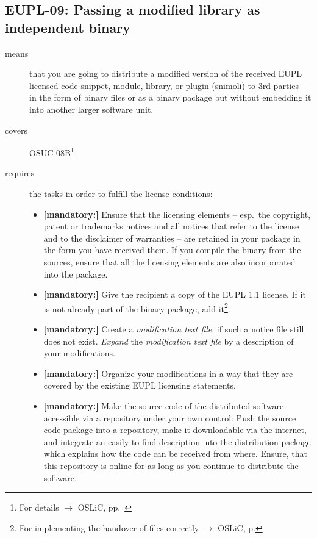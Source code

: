 \subsection{EUPL-09: Passing a modified library as independent binary}
\label{OSUC-08B-EUPL}

\begin{description}
\item[means] that you are going to distribute a modified version of the received
EUPL licensed code snippet, module, library, or plugin (snimoli) to 3rd parties
-- in the form of binary files or as a binary package but without embedding it
into another larger software unit.
\item[covers] OSUC-08B\footnote{For details $\rightarrow$ OSLiC, pp.\ \pageref{OSUC-08B-DEF}}
\item[requires] the tasks in order to fulfill the license conditions:
\begin{itemize}

  \item \textbf{[mandatory:]} Ensure that the licensing elements -- esp.\ the
  copyright, patent or trademarks notices and all notices that refer to the
  license and to the disclaimer of warranties -- are retained in your package in
  the form you have received them. If you compile the binary from the sources,
  ensure that all the licensing elements are also incorporated into the package.
  
 \item \textbf{[mandatory:]} Give the recipient a copy of the EUPL 1.1
  license. If it is not already part of the binary package, add
  it\footnote{For implementing the handover of files correctly $\rightarrow$
  OSLiC, p. \pageref{DistributingFilesHint}}.

  \item \textbf{[mandatory:]} Create a \emph{modification text file}, if such a
  notice file still does not exist. \emph{Expand} the \emph{modification text
  file} by a description of your modifications.

  \item \textbf{[mandatory:]} Organize your modifications in a way that they are
  covered by the existing EUPL licensing statements.
  
  \item \textbf{[mandatory:]} Make the source code of the distributed software
  accessible via a repository under your own control: Push the source code
  package into a repository, make it downloadable via the internet, and
  integrate an easily to find description into the distribution package which
  explains how the code can be received from where. Ensure, that this repository
  is online for as long as you continue to distribute the software.
  

\end{itemize}
\end{description}
